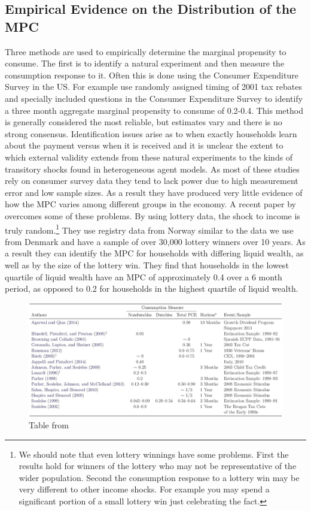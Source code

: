 \documentclass[titlepage]{\econtex}\newcommand{\texname}{IncomeUncertainty}
\begin{document}
\subsection{Empirical Evidence on the Distribution of the MPC}
Three methods are used to empirically determine the marginal propensity to consume. The first is to identify a natural experiment and then measure the consumption response to it. Often this is done using the Consumer Expenditure Survey in the US. For example \cite{johnson_household_2006} use randomly assigned timing of 2001 tax rebates and specially included questions in the Consumer Expenditure Survey to identify a three month aggregate marginal propensity to consume of 0.2-0.4. This method is generally considered the most reliable, but estimates vary and there is no strong consensus. Identification issues arise as to when exactly households learn about the payment versus when it is received and it is unclear the extent to which external validity extends from these natural experiments to the kinds of transitory shocks found in heterogeneous agent models. As most of these studies rely on consumer survey data they tend to lack power due to high measurement error and low sample sizes. As a result they have produced very little evidence of how the MPC varies among different groups in the economy. A recent paper by \cite{fagereng_mpc_2016} overcomes some of these problems. By using lottery data, the shock to income is truly random.\footnote{We should note that even lottery winnings have some problems. First the results hold for winners of the lottery who may not be representative of the wider population. Second the consumption response to a lottery win may be very different to other income shocks. For example you may spend a significant portion of a small lottery win just celebrating the fact.} They use registry data from Norway similar to the data we use from Denmark and have a sample of over 30,000 lottery winners over 10 years. As a result they can identify the MPC for households with differing liquid wealth, as well as by the size of the lottery win. They find that households in the lowest quartile of liquid wealth have an MPC of approximately 0.4 over a 6 month period, as opposed to 0.2 for households in the highest quartile of liquid wealth.
	\begin{figure} 
	\begin{centering}
		\includegraphics[scale=0.5]{Figures/MPCEmpiricalTable.jpg}
		\caption{Table from \cite{carroll_distribution_2016}}
		\label{fig:MPCtable}
	\end{centering}
\end{figure}
\end{document}
